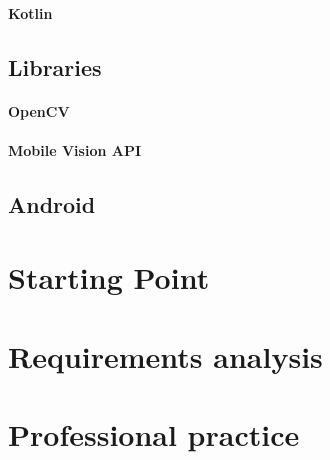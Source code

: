 \paragraph{Kotlin}

\subsection{Libraries}
\paragraph{OpenCV}
\paragraph{Mobile Vision API}

\subsection{Android}

\section{Starting Point}

\section{Requirements analysis}


\section{Professional practice}
